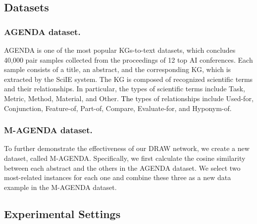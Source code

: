 \documentclass[letterpaper]{article}
\def\hmg{\textcolor{black}}
\begin{document}
\subsection{Datasets}
\subsubsection{AGENDA dataset.} 
AGENDA is one of the most popular KGs-to-text datasets, which concludes 40,000 pair samples collected from the proceedings of 12 top AI conferences.
Each sample consists of a title, an abstract, and the corresponding KG, which is extracted by the SciIE system.
The KG is composed of recognized scientific terms and their relationships.
In particular, the types of scientific terms include Task, Metric, Method, Material, and Other. \hmg{The} types of relationships include Used-for, Conjunction, Feature-of, Part-of, Compare, Evaluate-for, and Hyponym-of.

\subsubsection{M-AGENDA dataset.} 
To further demonstrate the effectiveness of our DRAW network, we create a new dataset, called M-AGENDA. 
Specifically, we first calculate the cosine similarity between each abstract and the others in the AGENDA dataset.
We select two most-related instances for each one and combine these three as a new data example in the M-AGENDA dataset.


\subsection{Experimental Settings}
\end{document}
